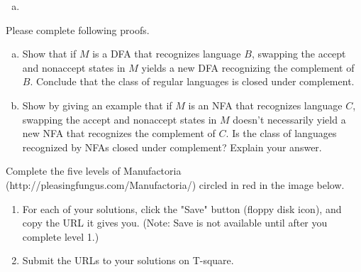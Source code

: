 \documentclass[10pt, legalpaper]{exam}
\begin{document}
\begin{questions}
\begin{enumerate}[(a)]
\begin{tikzpicture}[->,
            >=latex,
            auto,
            node distance=2.5cm,
            semithick,
            baseline=(top.base)]
    \end{tikzpicture}
    
    \item {}    
\end{enumerate}

\newpage
\addpoints
\question[20] Please complete following proofs.
\begin{enumerate}[(a)]
\item {Show that if $M$ is a DFA that recognizes language $B$, swapping the accept and nonaccept states in $M$ yields a new DFA recognizing the complement of $B$. Conclude that the class of regular languages is closed under complement.}
\item {Show by giving an example that if $M$ is an NFA that recognizes language $C$, swapping the accept and nonaccept states in $M$ doesn't necessarily yield a new NFA that recognizes the complement of $C$. Is the class of languages recognized by NFAs closed under complement? Explain your answer.}
\end{enumerate}
\newpage

\addpoints
\question[25] Complete the five levels of Manufactoria (http://pleasingfungus.com/Manufactoria/) circled in red in the image below.
\begin{enumerate}
\item For each of your solutions, click the "Save" button (floppy disk icon), and copy the URL it gives you. (Note: Save is not available until after you complete level 1.)

\item Submit the URLs to your solutions on T-square.


\end{enumerate}
\end{questions}
\end{document}
